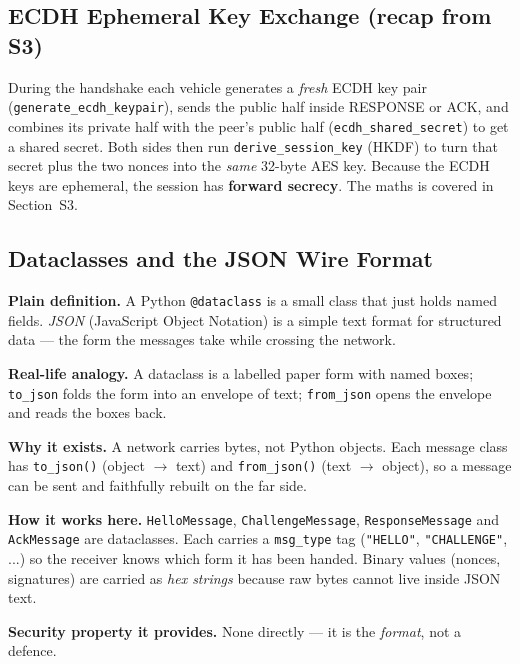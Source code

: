 \documentclass[11pt,a4paper]{report}
\begin{document}
\subsection{ECDH Ephemeral Key Exchange (recap from S3)}
During the handshake each vehicle generates a \emph{fresh} ECDH key pair
(\texttt{generate\_ecdh\_keypair}), sends the public half inside RESPONSE or ACK,
and combines its private half with the peer's public half
(\texttt{ecdh\_shared\_secret}) to get a shared secret. Both sides then run
\texttt{derive\_session\_key} (HKDF) to turn that secret plus the two nonces into
the \emph{same} 32-byte AES key. Because the ECDH keys are ephemeral, the session
has \textbf{forward secrecy}. The maths is covered in Section~S3.

\subsection{Dataclasses and the JSON Wire Format}
\textbf{Plain definition.} A Python \texttt{@dataclass} is a small class that
just holds named fields. \emph{JSON} (JavaScript Object Notation) is a simple
text format for structured data --- the form the messages take while crossing
the network.

\textbf{Real-life analogy.} A dataclass is a labelled paper form with named
boxes; \texttt{to\_json} folds the form into an envelope of text; \texttt{from\_json}
opens the envelope and reads the boxes back.

\textbf{Why it exists.} A network carries bytes, not Python objects. Each message
class has \texttt{to\_json()} (object $\to$ text) and \texttt{from\_json()} (text
$\to$ object), so a message can be sent and faithfully rebuilt on the far side.

\textbf{How it works here.} \texttt{HelloMessage}, \texttt{ChallengeMessage},
\texttt{ResponseMessage} and \texttt{AckMessage} are dataclasses. Each carries a
\texttt{msg\_type} tag (\texttt{"HELLO"}, \texttt{"CHALLENGE"}, ...) so the
receiver knows which form it has been handed. Binary values (nonces, signatures)
are carried as \emph{hex strings} because raw bytes cannot live inside JSON text.

\textbf{Security property it provides.} None directly --- it is the
\emph{format}, not a defence.
\end{document}
